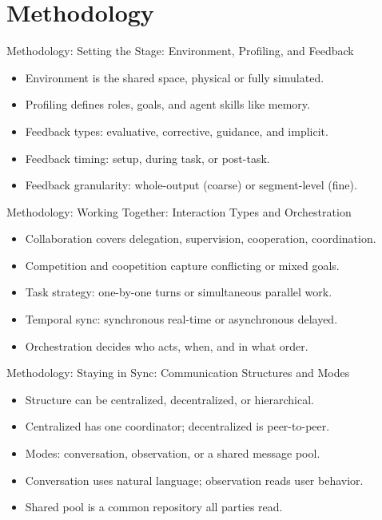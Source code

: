 \documentclass[10pt]{beamer}
\begin{document}
\section{Methodology}
\begin{frame}[allowframebreaks]{Methodology: Setting the Stage: Environment, Profiling, and Feedback}
\begin{itemize}
  \item Environment is the shared space, physical or fully simulated.
  \item Profiling defines roles, goals, and agent skills like memory.
  \item Feedback types: evaluative, corrective, guidance, and implicit.
  \item Feedback timing: setup, during task, or post-task.
  \item Feedback granularity: whole-output (coarse) or segment-level (fine).
\end{itemize}
\end{frame}
\begin{frame}[allowframebreaks]{Methodology: Working Together: Interaction Types and Orchestration}
\begin{itemize}
  \item Collaboration covers delegation, supervision, cooperation, coordination.
  \item Competition and coopetition capture conflicting or mixed goals.
  \item Task strategy: one-by-one turns or simultaneous parallel work.
  \item Temporal sync: synchronous real-time or asynchronous delayed.
  \item Orchestration decides who acts, when, and in what order.
\end{itemize}
\end{frame}
\begin{frame}[allowframebreaks]{Methodology: Staying in Sync: Communication Structures and Modes}
\begin{itemize}
  \item Structure can be centralized, decentralized, or hierarchical.
  \item Centralized has one coordinator; decentralized is peer-to-peer.
  \item Modes: conversation, observation, or a shared message pool.
  \item Conversation uses natural language; observation reads user behavior.
  \item Shared pool is a common repository all parties read.
\end{itemize}
\end{frame}
\end{document}
